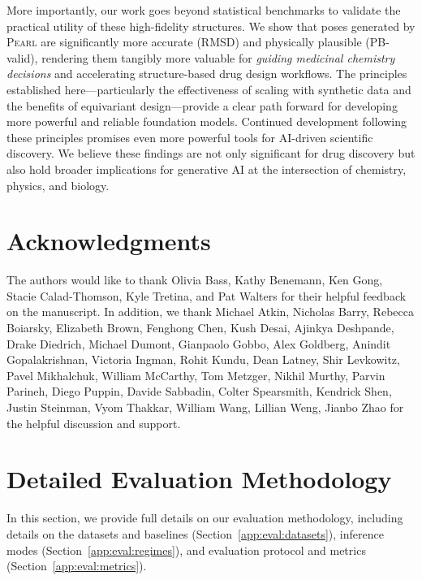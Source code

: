 \documentclass[11pt, letterpaper, onecolumn]{tau-class/tau}
\newcommand{\pearl}{\textsc{Pearl}\xspace}
\begin{document}
More importantly, our work goes beyond statistical benchmarks to validate the practical utility of these high-fidelity structures.
We show that poses generated by \pearl are significantly more accurate (RMSD) and physically plausible (PB-valid), rendering them tangibly more valuable for \emph{guiding medicinal chemistry decisions} and accelerating structure-based drug design workflows.
The principles established here---particularly the effectiveness of scaling with synthetic data and the benefits of equivariant design---provide a clear path forward for developing more powerful and reliable foundation models.
Continued development following these principles promises even more powerful tools for AI-driven scientific discovery.
We believe these findings are not only significant for drug discovery but also hold broader implications for generative AI at the intersection of chemistry, physics, and biology.


\section*{Acknowledgments}
\label{sec:aknowledgement}

The authors would like to thank Olivia Bass, Kathy Benemann, Ken Gong, Stacie Calad-Thomson, Kyle Tretina, and Pat Walters for their helpful feedback on the manuscript.
In addition, we thank Michael Atkin, Nicholas Barry, Rebecca Boiarsky, Elizabeth Brown, Fenghong Chen, Kush Desai, Ajinkya Deshpande, Drake Diedrich, Michael Dumont, Gianpaolo Gobbo, Alex Goldberg, Anindit Gopalakrishnan, Victoria Ingman, Rohit Kundu, Dean Latney, Shir Levkowitz, Pavel Mikhalchuk, William McCarthy, Tom Metzger, Nikhil Murthy, Parvin Parineh, Diego Puppin, Davide Sabbadin, Colter Spearsmith, Kendrick Shen, Justin Steinman, Vyom Thakkar, William Wang, Lillian Weng, Jianbo Zhao for the helpful discussion and support.

\printbibliography

\clearpage
\appendix

\section{Detailed Evaluation Methodology}
\label{app:evals}

In this section, we provide full details on our evaluation methodology, including details on the datasets and baselines (Section~\ref{app:eval:datasets}), inference modes (Section~\ref{app:eval:regimes}), and evaluation protocol and metrics (Section~\ref{app:eval:metrics}).
\end{document}
